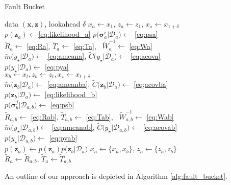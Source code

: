 \documentclass{article}
\newcommand{\cm}[1]{\ensuremath{\mathcal{#1}}}
\newcommand{\bm}[1]{\ensuremath{\mathbf{#1}}}
\newcommand{\data}{\ensuremath{\cm{D}}}
\newcommand{\vect}[1]{\bm{#1}}
\newcommand{\vz}{\vect{z}}
\newcommand{\vx}{\vect{x}}
\newcommand{\vs}{\vect{\sigma}}
\newcommand{\amean}[2]{\tilde{{m}}\bigl(#1\big\vert#2\bigr)}
\newcommand{\acov}[2]{\tilde{{C}}\bigl(#1\big\vert#2\bigr)}
\newcommand{\p}[2]{p\bigl(#1\big\vert#2\bigr)}
\newcommand{\fPr}{p}
\newcommand{\Prob}[2]{\fPr\bigl(#1\big\vert#2\bigr)}
\newcommand{\st}{_{\star}}
\begin{document}
\begin{algorithm}[tb]
   \caption{Fault Bucket}
\label{alg:fault_bucket}
\begin{algorithmic}
    data $(\vx,\vz)$, lookahead $\delta$
\STATE $x_a \leftarrow x_1,\, z_a \leftarrow z_1,
\,x\st \leftarrow x_{1+\delta}$
\\
 $p(\vz_a) \leftarrow$\eqref{eq:likelihood_a}
 $\Prob{\vs^i_a}{\data_{a}} \leftarrow$ \eqref{eq:psa}\\
\ENDFOR
 \STATE $\tilde{R}_a \leftarrow$ \eqref{eq:Ra}, $\tilde{T}_a\leftarrow$ \eqref{eq:Ta}, \, $\tilde{W}^{-1}_a \leftarrow$ \eqref{eq:Wa}\\
 \STATE $\amean{y\st}{\data_a} \leftarrow$ \eqref{eq:ameana}, $\acov{y\st}{\data_a} \leftarrow$ \eqref{eq:acova}\\
 $\p{y\st}{\data_{a}} \leftarrow$ \eqref{eq:pya}\\
\STATE $x_b \leftarrow x_t, z_b \leftarrow z_t, x\st \leftarrow x_{t+\delta}$\\
\STATE $\amean{\vz_b}{\data_a} \leftarrow$ \eqref{eq;ameanba}, $\acov{\vz_b}{\data_a} \leftarrow$ \eqref{eq;acovba}\\
\STATE $\p{\vz_b}{\data_a} \leftarrow$ \eqref{eq:likelihood_b}\\
 $\Prob{\vs^j_b}{\data_{a,b}} \leftarrow$ \eqref{eq:psb}\\
\ENDFOR
\STATE $\tilde{R}_{a,b} \leftarrow$ \eqref{eq:Rab}, $\tilde{T}_{a,b}\leftarrow$ \eqref{eq:Tab}, \, $\tilde{W}^{-1}_{a,b} \leftarrow$ \eqref{eq:Wab}\\
 \STATE $\amean{y\st}{\data_{a,b}} \leftarrow$ \eqref{eq:ameanab}, $\acov{y\st}{\data_{a,b}} \leftarrow$ \eqref{eq:acovab}\\
 $\p{y\st}{\data_{a,b}}\leftarrow$ \eqref{eq:pyab}\\
 $p(\vz_a) \leftarrow p(\vz_a)\p{\vz_b}{\data_a}$
\STATE $x_a \leftarrow \{x_a,x_b\},\, z_a \leftarrow \{z_a,z_b\}$\\
\STATE $\tilde{R}_a \leftarrow \tilde{R}_{a,b},\, \tilde{T}_a\leftarrow \tilde{T}_{a,b}$\\
\ENDFOR 
\end{algorithmic}
\end{algorithm}

An outline of our approach is depicted in Algorithm \ref{alg:fault_bucket}.
\end{document}
